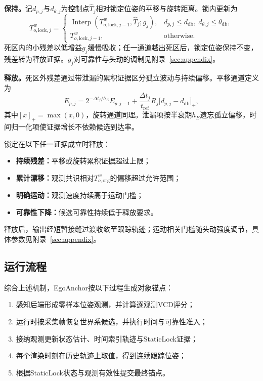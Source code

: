 \documentclass[review]{vgtc}
\begin{document}
\textbf{保持。}记$d_{p,j}$与$d_{\theta,j}$为控制点$\widehat T_j$相对锁定位姿的平移与旋转距离。锁内更新为
\begin{equation}
T_{o,\mathrm{lock},j}^w=
\begin{cases}
\operatorname{Interp}(T_{o,\mathrm{lock},j-1}^w,\widehat T_j;g_j),
& d_{p,j}\le d_{\mathrm{db}},\ d_{\theta,j}\le\theta_{\mathrm{db}},\\
T_{o,\mathrm{lock},j-1}^w, & \text{otherwise}.
\end{cases}
\label{eq:lock-update}
\end{equation}
死区内的小残差以低增益$g_j$缓慢吸收；任一通道越出死区后，锁定位姿保持不变，残差转为释放证据。$g_j$对可靠性与头动的调制见附录~\ref{sec:appendix}。

\textbf{释放。}死区外残差通过带泄漏的累积证据区分孤立波动与持续偏移。平移通道定义为
\begin{equation}
E_{p,j}=2^{-\Delta t_j/h_E}E_{p,j-1}
+\frac{\Delta t_j}{t_{\mathrm{ref}}}R_j
\bigl[d_{p,j}-d_{\mathrm{db}}\bigr]_+,
\label{eq:cusum}
\end{equation}
其中$[x]_+=\max(x,0)$，旋转通道同理。泄漏项按半衰期$h_E$遗忘孤立偏移，时间归一化项使证据增长不依赖候选到达率。

锁定在以下任一证据成立时释放：
\begin{itemize}[nosep,leftmargin=1.4em]
  \item \textbf{持续残差：}平移或旋转累积证据超过上限；
  \item \textbf{累计漂移：}观测共识相对$T_{o,\mathrm{org}}^w$的偏移超过允许范围；
  \item \textbf{明确运动：}观测速度持续高于运动门槛；
  \item \textbf{可靠性下降：}候选可靠性持续低于释放要求。
\end{itemize}
释放后，输出经短暂接缝过渡收敛至跟踪轨迹；运动相关门槛随头动强度调节，具体参数见附录~\ref{sec:appendix}。

\subsection{运行流程}\label{sec:runtime-alg}

综合上述机制，EgoAnchor按以下过程生成对象锚点：
\begin{enumerate}[leftmargin=1.6em,itemsep=1pt,topsep=2pt]
  \item 感知后端形成零样本位姿观测，并计算逐观测VCD评分；
  \item 运行时按采集帧恢复世界系候选，并执行时间与可靠性准入；
  \item 接纳观测更新状态估计、时间索引轨迹与StaticLock证据；
  \item 每个渲染时刻在历史轨迹上取值，得到连续跟踪位姿；
  \item 根据StaticLock状态与观测有效性提交最终锚点。
\end{enumerate}
\end{document}
